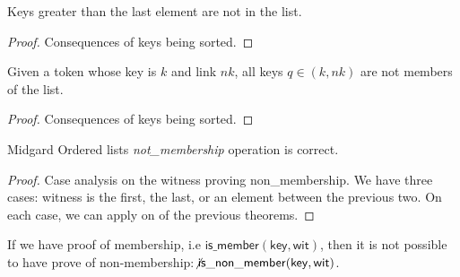 \begin{theorem}
  \label{thm:MOList.Properties.non_membership_after_last}
  \leanok
  Keys greater than the last element are not in the list.
  \end{theorem}
\begin{proof}
  Consequences of keys being sorted.
  \end{proof}

\begin{theorem}
  \label{thm:MOList.Properties.non_membership_witness}
  \leanok
  Given a token whose key is \(k\) and link \(nk\),
  all keys \(q \in (k,nk)\) are not members of the list.
  \end{theorem}

\begin{proof}
  Consequences of keys being sorted.
  \end{proof}

\begin{theorem}
  \label{thm:MOList.Properties.non_membership_ne_member}
  \leanok
  Midgard Ordered lists \emph{not\_membership} operation is correct.
  \end{theorem}

\begin{proof}
  Case analysis on the witness proving non\_membership.
  We have three cases: witness is the first, the last, or an element between the
  previous two.
  On each case, we can apply on of the previous theorems.
  \end{proof}

\begin{theorem}
  \label{thm:MOList.Properties.is_member_not_non_member}
  \leanok
  If we have proof of membership, i.e \(\mathsf{is\_member(key,wit)}\), then
  it is not possible to have prove of
non-membership:\(\not \mathsf{is\_non\_member(key,wit)}\).
  \end{theorem}

